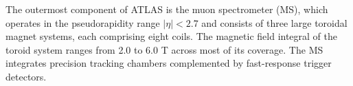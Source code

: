 The outermost component of ATLAS is the muon spectrometer (MS), which operates in the pseudorapidity range $|\eta|<2.7$
and consists of three large toroidal magnet systems, each comprising eight coils.
The magnetic field integral of the toroid system ranges from 2.0 to 6.0 T across most of its coverage.
The MS integrates precision tracking chambers complemented by fast-response trigger detectors.

% 
% 
% 
